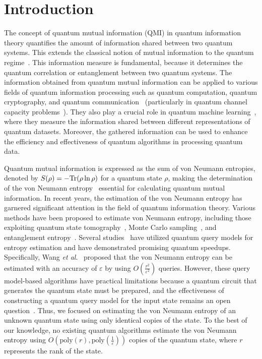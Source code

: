 \documentclass[aps,groupedaddress,superscriptaddress,amssymb,amsmath,amsbsy,amsfonts,twocolumn,pra]{revtex4}
\begin{document}
\maketitle

\section{\label{sec:Introduction}Introduction}
The concept of quantum mutual information (QMI) in quantum information theory quantifies the amount of information shared between two quantum systems. This extends the classical notion of mutual information to the quantum regime~\cite{J07,NC00,W17}. This information measure is fundamental, because it determines the quantum correlation or entanglement between two quantum systems. The information obtained from quantum mutual information can be applied to various fields of quantum information processing such as quantum computation, quantum cryptography, and quantum communication~\cite{NC00,W17} (particularly in quantum channel capacity problems~\cite{BS04,H20}). They also play a crucial role in quantum machine learning~\cite{BWP+17,CCC+19}, where they measure the information shared between different representations of quantum datasets. Moreover, the gathered information can be used to enhance the efficiency and effectiveness of quantum algorithms in processing quantum data.

Quantum mutual information is expressed as the sum of von Neumann entropies, denoted by $S(\rho)=-{\textnormal{Tr}}(\rho\ln\rho)$ for a quantum state $\rho$, making the determination of the von Neumann entropy~\cite{BZ17} essential for calculating quantum mutual information. In recent years, the estimation of the von Neumann entropy has garnered significant attention in the field of quantum information theory. Various methods have been proposed to estimate von Neumann entropy, including those exploiting quantum state tomography~\cite{OW16}, Monte Carlo sampling~\cite{HGKM10}, and entanglement entropy~\cite{CCD09,GHS21,AISW20,TV21,WZW22,WGL+22,GL19,SH21}. Several studies~\cite{WGL+22,GL19,SH21} have utilized quantum query models for entropy estimation and have demonstrated promising quantum speedups. Specifically, Wang \emph{et al}.~\cite{WGL+22} proposed that the von Neumann entropy can be estimated with an accuracy of $\varepsilon$ by using $O(\frac{r^2}{\varepsilon^2})$ queries. However, these query model-based algorithms have practical limitations because a quantum circuit that generates the quantum state must be prepared, and the effectiveness of constructing a quantum query model for the input state remains an open question~\cite{WZW22}. Thus, we focused on estimating the von Neumann entropy of an unknown quantum state using only identical copies of the state. To the best of our knowledge, no existing quantum algorithms estimate the von Neumann entropy using $O(\text{poly}(r), \text{poly}(\frac{1}{\varepsilon}))$ copies of the quantum state, where $r$ represents the rank of the state.
\end{document}
